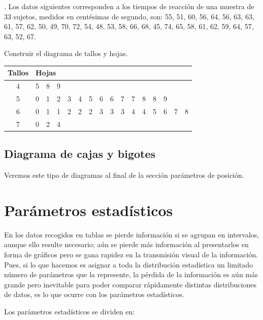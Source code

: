 \vspace{5mm}%

\begin{example}
	. Los datos siguientes corresponden a los tiempos de reacción de una muestra de $33$ sujetos, medidos en centésimas de segundo, son:
55, 51, 60, 56, 64, 56, 63, 63, 61, 57, 62, 50, 49, 70, 72, 54, 48, 53, 58, 66, 68, 45, 74, 65, 58, 61, 62, 59, 64, 57, 63, 52, 67.

\vspace{2mm} Construir el diagrama de tallos y hojas.

\begin{table}[H]
\centering
\begin{tabular}{c|ccccccccccccccc}
Tallos & \multicolumn{15}{l}{Hojas} \\ \hline
4 & 5 & 8 & 9 &  &  &  &  &  &  &  &  &  &  &  &  \\
5 & 0 & 1 & 2 & 3 & 4 & 5 & 6 & 6 & 7 & 7 & 8 & 8 & 9 &  &  \\
6 & 0 & 1 & 1 & 2 & 2 & 2 & 3 & 3 & 3 & 4 & 4 & 5 & 6 & 7 & 8 \\
7 & 0 & 2 & 4 &  &  &  &  &  &  &  &  &  &  &  & 
\end{tabular}
\end{table}
\end{example}


\subsection{Diagrama de cajas y bigotes}
Veremos este tipo de diagramas al final de la sección parámetros de posición.




\section{Parámetros estadísticos}

En los datos recogidos en tablas se pierde información si se agrupan en intervalos, aunque ello resulte necesario; aún se pierde más información al presentarlos en forma de gráficos pero se gana rapidez en la transmisión visual de la información. Pues, si lo que hacemos es asignar a toda la distribución estadística un limitado número de parámetros que la represente, la pérdida de la información es aún más grande pero inevitable para poder comparar rápidamente distintas distribuciones de datos, es lo que ocurre con los parámetros estadísticos.

Los parámetros estadísticos se dividen en:

